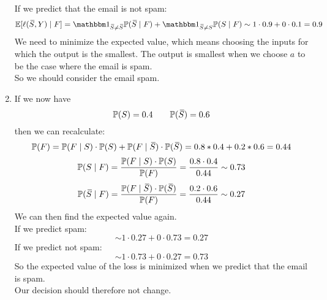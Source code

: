 \documentclass[12pt]{article}
\begin{document}
\begin{enumerate}[label=\letters]
    If we predict that the email is not spam:
    \[ \ebb[\ell(\olsi{S}, Y) \mid F]
    = \indicator_{\olsi{S} \neq \olsi{S}}
    \pbb(\olsi{S} \mid F) +
    \indicator_{\olsi{S} \neq S}
    \pbb(S \mid F) 
    \sim 1 \cdot 0.9 + 0 \cdot 0.1 = 0.9 \]
    We need to minimize the expected value,
    which means
    choosing the inputs for which the output
    is the smallest.
    The output is smallest when we choose
    $a$ to be the case where the email is spam. \\
    So we should consider the email spam.
    \item 
    If we now have
    \[ \mathbb{P}(S) = 0.4 \qquad 
    \mathbb{P}(\,\overline{\!{S}}) = 0.6 \]
    then we can recalculate:
    \[\mathbb{P}(F) = \mathbb{P}(F \mid S) \cdot \mathbb{P}(S)
    +  \mathbb{P}(F \mid \,\overline{\!{S}}) \cdot \mathbb{P}(\,\overline{\!{S}})
    = 0.8 * 0.4 + 0.2 * 0.6 = 0.44 \]
    \[ \mathbb{P}(S \mid F)
    = \dfrac{\mathbb{P}(F \mid S) \cdot \mathbb{P}(S)}{\mathbb{P}(F)}
    = \dfrac{0.8 \cdot 0.4}{0.44}
    \sim 0.73 \]
    \[ \mathbb{P}(\,\overline{\!{S}} \mid F)
    = \dfrac{\mathbb{P}(F \mid \,\overline{\!{S}}) \cdot \mathbb{P}(\,\overline{\!{S}})}
    {\mathbb{P}(F)}
    = \dfrac{0.2 \cdot 0.6}{0.44}
    \sim 0.27 \]
    We can then find the expected value again. \\
    If we predict spam:
    \[ \sim 1 \cdot 0.27 + 0 \cdot 0.73 = 0.27  \]
    If we predict not spam:
    \[ \sim 1 \cdot 0.73 + 0 \cdot 0.27 = 0.73  \]
    So the expected value of the loss is minimized
    when we predict that the email is spam. \\
    Our decision should therefore not change. \\
\end{enumerate}
\end{document}
